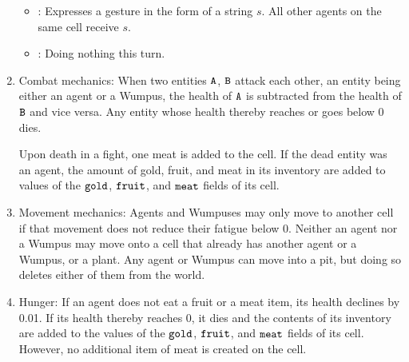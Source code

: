 \begin{definition}
\begin{enumerate}
\begin{itemize}
		\item{}: Expresses a gesture in the form of a string $s$. All other agents on the same cell receive $s$.
		
		\item{}: Doing nothing this turn.
	\end{itemize}
	
	\item {\upshape Combat mechanics:} When two entities $\mathtt{A}$, $\mathtt{B}$ attack each other, an entity being either an agent or a Wumpus, the health of $\mathtt{A}$ is subtracted from the health of $\mathtt{B}$ and vice versa. Any entity whose health thereby reaches or goes below 0 dies.
	
	Upon death in a fight, one meat is added to the cell. If the dead entity was an agent, the amount of gold, fruit, and meat in its inventory are added to values of the $\mathtt{gold}$, $\mathtt{fruit}$, and $\mathtt{meat}$ fields of its cell.
	
	\item {\upshape Movement mechanics:} Agents and Wumpuses may only move to another cell if that movement does not reduce their fatigue below 0. Neither an agent nor a Wumpus may move onto a cell that already has another agent or a Wumpus, or a plant. Any agent or Wumpus can move into a pit, but doing so deletes either of them from the world.
	
	\item {\upshape Hunger:} If an agent does not eat a fruit or a meat item, its health declines by 0.01. If its health thereby reaches 0, it dies and the contents of its inventory are added to the values of the $\mathtt{gold}$, $\mathtt{fruit}$, and $\mathtt{meat}$ fields of its cell. However, no additional item of meat is created on the cell.
\end{enumerate}
\end{definition}

